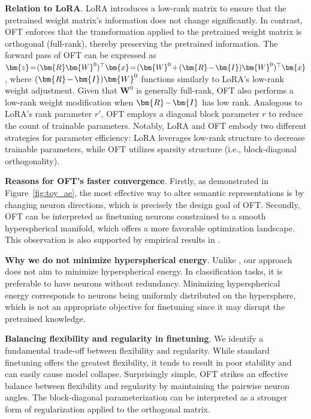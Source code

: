 \textbf{Relation to LoRA}. LoRA introduces a low-rank matrix to ensure that the pretrained weight matrix's information does not change significantly. In contrast, OFT enforces that the transformation applied to the pretrained weight matrix is orthogonal (full-rank), thereby preserving the pretrained information. The forward pass of OFT can be expressed as $\thickmuskip=2mu \medmuskip=2mu \bm{z} = (\bm{R}\bm{W}^0)^\top \bm{x} = (\bm{W}^0 + (\bm{R} - \bm{I}) \bm{W}^0)^\top \bm{x}$, where $\thickmuskip=2mu \medmuskip=2mu (\bm{R} - \bm{I}) \bm{W}^0$ functions similarly to LoRA's low-rank weight adjustment. Given that $\bm{W}^0$ is generally full-rank, OFT also performs a low-rank weight modification when $\thickmuskip=2mu \medmuskip=2mu \bm{R} - \bm{I}$ has low rank. Analogous to LoRA's rank parameter $r'$, OFT employs a diagonal block parameter $r$ to reduce the count of trainable parameters. Notably, LoRA and OFT embody two different strategies for parameter efficiency: LoRA leverages low-rank structure to decrease trainable parameters, while OFT utilizes sparsity structure (i.e., block-diagonal orthogonality).

\textbf{Reasons for OFT's faster convergence}. Firstly, as demonstrated in Figure~\ref{fig:toy_ae}, the most effective way to alter semantic representations is by changing neuron directions, which is precisely the design goal of OFT. Secondly, OFT can be interpreted as finetuning neurons constrained to a smooth hyperspherical manifold, which offers a more favorable optimization landscape. This observation is also supported by empirical results in \cite{liu2021orthogonal}.

\textbf{Why we do not minimize hyperspherical energy}. Unlike \cite{liu2021orthogonal}, our approach does not aim to minimize hyperspherical energy. In classification tasks, it is preferable to have neurons without redundancy. Minimizing hyperspherical energy corresponds to neurons being uniformly distributed on the hypersphere, which is not an appropriate objective for finetuning since it may disrupt the pretrained knowledge.

\textbf{Balancing flexibility and regularity in finetuning}. We identify a fundamental trade-off between flexibility and regularity. While standard finetuning offers the greatest flexibility, it tends to result in poor stability and can easily cause model collapse. Surprisingly simple, OFT strikes an effective balance between flexibility and regularity by maintaining the pairwise neuron angles. The block-diagonal parameterization can be interpreted as a stronger form of regularization applied to the orthogonal matrix.

